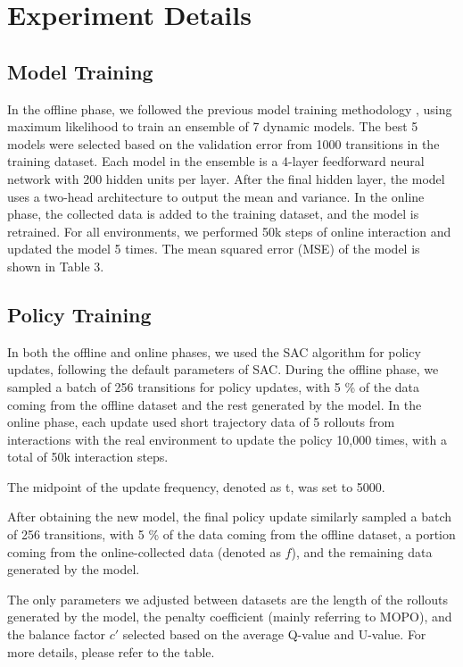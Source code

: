 \documentclass[letterpaper]{article} %
\begin{document}
\iffalse
\appendix
\section{Experiment Details}
\label{a}
\subsection{Model Training}
In the offline phase, we followed the previous model training methodology \cite{mopo,combo}, using maximum likelihood to train an ensemble of 7 dynamic models. The best 5 models were selected based on the validation error from 1000 transitions in the training dataset. Each model in the ensemble is a 4-layer feedforward neural network with 200 hidden units per layer. After the final hidden layer, the model uses a two-head architecture to output the mean and variance. In the online phase, the collected data is added to the training dataset, and the model is retrained. For all environments, we performed 50k steps of online interaction and updated the model 5 times. The mean squared error (MSE) of the model is shown in Table 3.

\subsection{Policy Training}
In both the offline and online phases, we used the SAC algorithm for policy updates, following the default parameters of SAC. During the offline phase, we sampled a batch of 256 transitions for policy updates, with 5 \% of the data coming from the offline dataset and the rest generated by the model. In the online phase, each update used short trajectory data of 5 rollouts from interactions with the real environment to update the policy 10,000 times, with a total of 50k interaction steps.

The midpoint of the update frequency, denoted as
t, was set to 5000.

After obtaining the new model, the final policy update similarly sampled a batch of 256 transitions, with 5 \% of the data coming from the offline dataset, a portion coming from the online-collected data (denoted as
$f$), and the remaining data generated by the model.

The only parameters we adjusted between datasets are the length of the rollouts generated by the model, the penalty coefficient (mainly referring to MOPO), and the balance factor $c'$ selected based on the average Q-value and U-value. For more details, please refer to the table.
\end{document}

